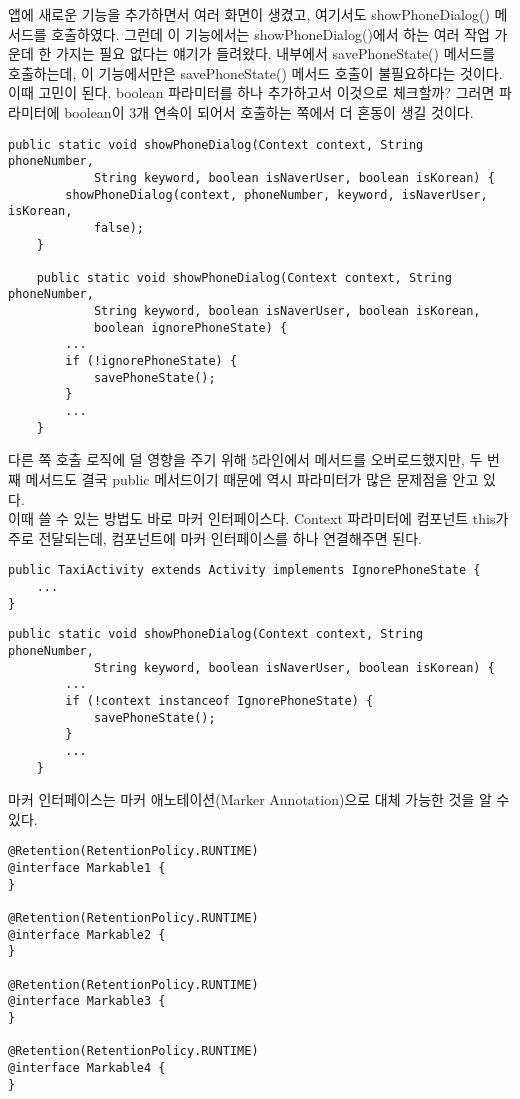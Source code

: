 앱에 새로운 기능을 추가하면서 여러 화면이 생겼고, 여기서도 showPhoneDialog() 메서드를 호출하였다.
그런데 이 기능에서는 showPhoneDialog()에서 하는 여러 작업 가운데 한 가지는 필요 없다는 얘기가 들려왔다.  내부에서 savePhoneState() 메서드를 호출하는데, 이 기능에서만은 savePhoneState() 메서드 호출이 불필요하다는 것이다.
이때 고민이 된다. boolean 파라미터를 하나 추가하고서 이것으로 체크할까? 그러면 파라미터에 boolean이 3개 연속이 되어서 호출하는 쪽에서 더 혼동이 생길 것이다.
\begin{lstlisting}[frame=single]
	public static void showPhoneDialog(Context context, String phoneNumber, 
			String keyword, boolean isNaverUser, boolean isKorean) {
		showPhoneDialog(context, phoneNumber, keyword, isNaverUser, isKorean, 
			false);
	}

	public static void showPhoneDialog(Context context, String phoneNumber, 
			String keyword, boolean isNaverUser, boolean isKorean, 
			boolean ignorePhoneState) {
		...
		if (!ignorePhoneState) {
			savePhoneState();
		}
		...
	}
\end{lstlisting}

다른 쪽 호출 로직에 덜 영향을 주기 위해 5라인에서 메서드를 오버로드했지만, 두 번째 메서드도 결국 public 메서드이기 때문에 역시 파라미터가 많은 문제점을 안고 있다.\\ 

이때 쓸 수 있는 방법도 바로 마커 인터페이스다. Context 파라미터에 컴포넌트 this가 주로 전달되는데, 컴포넌트에 마커 인터페이스를 하나 연결해주면 된다.

\begin{lstlisting}[frame=single]
public TaxiActivity extends Activity implements IgnorePhoneState {
	...
}
\end{lstlisting}

\begin{lstlisting}[frame=single]
	public static void showPhoneDialog(Context context, String phoneNumber, 
			String keyword, boolean isNaverUser, boolean isKorean) {
		...
		if (!context instanceof IgnorePhoneState) {
			savePhoneState();
		}
		...
	}
\end{lstlisting}	
	
마커 인터페이스는 마커 애노테이션(Marker Annotation)으로 대체 가능한 것을 알 수 있다.

\begin{lstlisting}[frame=single]
@Retention(RetentionPolicy.RUNTIME)
@interface Markable1 {
}

@Retention(RetentionPolicy.RUNTIME)
@interface Markable2 {
}

@Retention(RetentionPolicy.RUNTIME)
@interface Markable3 {
}

@Retention(RetentionPolicy.RUNTIME)
@interface Markable4 {
}
\end{lstlisting}

